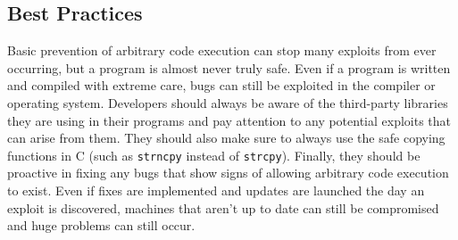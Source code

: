 \subsection{Best Practices}

Basic prevention of arbitrary code execution can stop many exploits from ever occurring, but a program is almost never truly safe. Even if a program is written and compiled with extreme care, bugs can still be exploited in the compiler or operating system. Developers should always be aware of the third-party libraries they are using in their programs and pay attention to any potential exploits that can arise from them. They should also make sure to always use the safe copying functions in C (such as \texttt{strncpy} instead of \texttt{strcpy}). Finally, they should be proactive in fixing any bugs that show signs of allowing arbitrary code execution to exist. Even if fixes are implemented and updates are launched the day an exploit is discovered, machines that aren’t up to date can still be compromised and huge problems can still occur.
